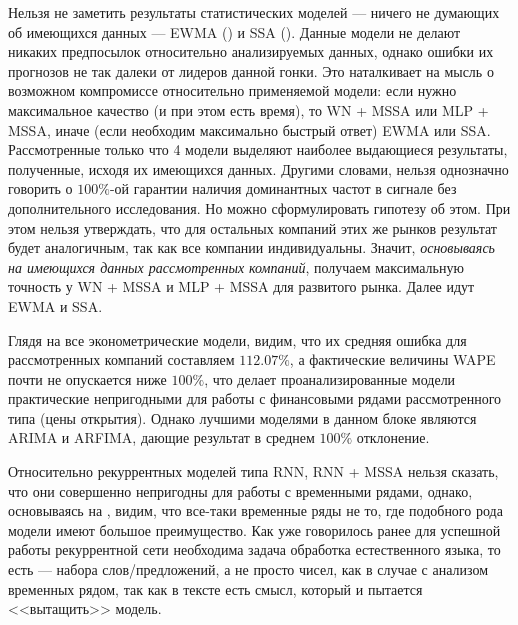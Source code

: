 Нельзя не заметить результаты статистических моделей --- ничего не думающих об имеющихся данных --- EWMA () и SSA (). Данные модели не делают никаких предпосылок относительно анализируемых данных, однако ошибки их прогнозов не так далеки от лидеров данной гонки. Это наталкивает на мысль о возможном компромиссе относительно применяемой модели: если нужно максимальное качество (и при этом есть время), то WN + MSSA или MLP + MSSA, иначе (если необходим максимально быстрый ответ) EWMA или SSA. Рассмотренные только что 4 модели выделяют наиболее выдающиеся результаты, полученные, исходя их имеющихся данных. Другими словами, нельзя однозначно говорить о $100\%$-ой гарантии наличия доминантных частот в сигнале без дополнительного исследования. Но можно сформулировать гипотезу об этом. При этом нельзя утверждать, что для остальных компаний этих же рынков результат будет аналогичным, так как все компании индивидуальны. Значит, \textit{основываясь на имеющихся данных рассмотренных компаний}, получаем максимальную точность у WN + MSSA и MLP + MSSA для развитого рынка. Далее идут EWMA и SSA.

Глядя на все эконометрические модели, видим, что их средняя ошибка для рассмотренных компаний составляем $112.07\%$, а фактические величины WAPE почти не опускается ниже $100\%$, что делает проанализированные модели практические непригодными для работы с финансовыми рядами рассмотренного типа (цены открытия). Однако лучшими моделями в данном блоке являются ARIMA и ARFIMA, дающие результат в среднем $100\%$ отклонение.

Относительно рекуррентных моделей типа RNN, RNN + MSSA нельзя сказать, что они совершенно непригодны для работы с временными рядами, однако, основываясь на \cite{transformers_are_useless_for_TSF}, видим, что все-таки временные ряды не то, где подобного рода модели имеют большое преимущество. Как уже говорилось ранее для успешной работы рекуррентной сети необходима задача обработка естественного языка, то есть --- набора слов/предложений, а не просто чисел, как в случае с анализом временных рядом, так как в тексте есть смысл, который и пытается <<вытащить>> модель.

